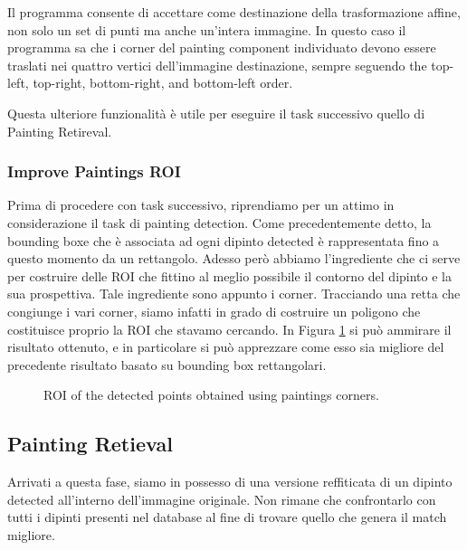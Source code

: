 \documentclass[10pt,twocolumn,letterpaper]{article}
\begin{document}
Il programma consente di accettare come destinazione della trasformazione affine, non solo un set di punti ma anche un'intera immagine. In questo caso il programma sa che i corner del painting component individuato devono essere traslati nei quattro vertici dell'immagine destinazione, sempre seguendo the top-left, top-right, bottom-right, and bottom-left order. 

Questa ulteriore funzionalità è utile per eseguire il task successivo quello di Painting Retireval.


\subsubsection{Improve Paintings ROI}

Prima di procedere con task successivo, riprendiamo per un attimo in considerazione il task di painting detection. Come precedentemente detto, la bounding boxe che è associata ad ogni dipinto detected è rappresentata fino a questo momento da un rettangolo. Adesso però abbiamo l'ingrediente che ci serve per costruire delle ROI che fittino al meglio possibile il contorno del dipinto e la sua prospettiva. Tale ingrediente sono appunto i corner. Tracciando una retta che congiunge i vari corner, siamo infatti in grado di costruire un poligono che costituisce proprio la ROI che stavamo cercando. In Figura \ref{fig:improvedROI} si può ammirare il risultato ottenuto, e in particolare si può apprezzare come esso sia migliore del precedente risultato basato su bounding box rettangolari. 


\begin{figure}[t]
   \begin{center}
   \fbox{\rule{0pt}{2in} \rule{0.9\linewidth}{0pt}}
   \end{center}
      \caption{ROI of the detected points obtained using paintings corners.}
   \label{fig:improvedROI}
\end{figure}


\subsection{Painting Retieval}

Arrivati a questa fase, siamo in possesso di una versione reffiticata di un dipinto detected all'interno dell'immagine originale. Non rimane che confrontarlo con tutti i dipinti presenti nel database al fine di trovare quello che genera il match migliore.
\end{document}
